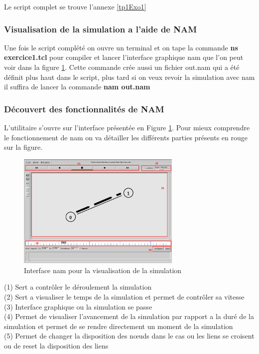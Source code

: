 \documentclass[11pt]{article}
\begin{document}
\noindent
Le script complet se trouve l'annexe \ref{tp1Exo1}

\subsubsection{Visualisation de la simulation a l'aide de NAM}
Une fois le script complété on ouvre un terminal et on tape la commande \textbf{ns exercice1.tcl} pour compiler et lancer l'interface graphique nam que l'on peut voir dans la figure \ref{namVisu}. Cette commande crée aussi un fichier out.nam qui a été définit plus haut dans le script, plus tard si on veux revoir la simulation avec nam il suffira de lancer la commande \textbf{nam out.nam}


\subsubsection{Découvert des fonctionnalités de NAM}
L'utilitaire s'ouvre sur l'interface présentée en Figure \ref{namVisu}. Pour mieux comprendre le fonctionnement de nam on va détailler les différents parties présents en rouge sur la figure.

\begin{figure}[H]
	\begin{center}
		\includegraphics[width=0.7\textwidth]{assets/tp1/nam-visualisation1.png}
	\end{center}
	\caption{Interface nam pour la visualisation de la simulation}
	\label{namVisu}
\end{figure}

\noindent
(1) Sert a contrôler le déroulement la simulation \\
(2) Sert a visualiser le temps de la simulation et permet de contrôler sa vitesse\\
(3) Interface graphique ou la simulation se passe \\
(4) Permet de visualiser l'avancement de la simulation par rapport a la duré de la simulation et permet de se rendre directement un moment de la simulation\\
(5) Permet de changer la disposition des nœuds dans le cas ou les liens se croisent ou de reset la disposition des liens\\
\end{document}
